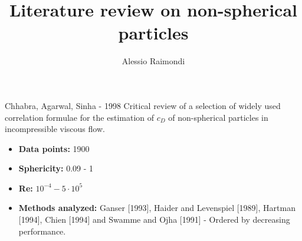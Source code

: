 \documentclass[11pt]{beamer}
\begin{document}
	\author{Alessio Raimondi}
	\title{Literature review on non-spherical particles}
	\begin{frame}[plain]
		\maketitle
	\end{frame}
	


	\begin{frame}{Chhabra, Agarwal, Sinha - 1998}
		Critical review of a selection of widely used correlation formulae for the estimation of $ c_D $ of non-spherical particles in incompressible viscous flow.
		\begin{itemize}
			\item \textbf{Data points:} 1900
			\item \textbf{Sphericity:} 0.09 - 1
			\item \textbf{Re:} $ 10^{-4} - 5 \cdot 10^5 $
			\item \textbf{Methods analyzed:} Ganser [1993], Haider and Levenspiel [1989], Hartman [1994], Chien [1994] and Swamme and Ojha [1991] - Ordered by decreasing performance.
		\end{itemize}
	\end{frame}
\end{document}
